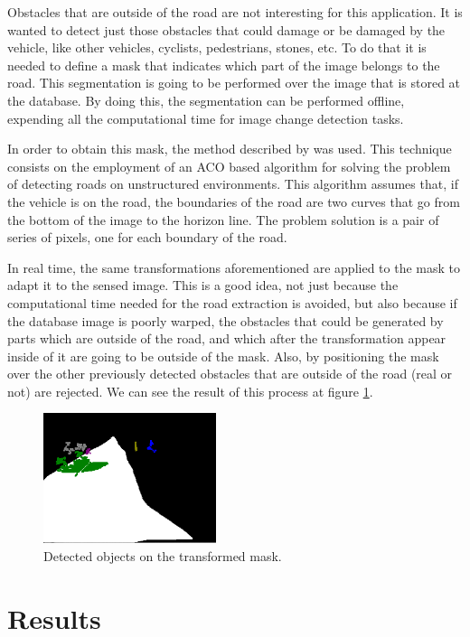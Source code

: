 Obstacles that are outside of the road are not interesting for this application. It is wanted to detect just those obstacles that could damage or be damaged by the vehicle, like other vehicles, cyclists, pedestrians, stones, etc. To do that it is needed to define a mask that indicates which part of the image belongs to the road. This segmentation is going to be performed over the image that is stored at the database. By doing this, the segmentation can be performed offline, expending all the computational time for image change detection tasks.

In order to obtain this mask, the method described by \cite{arnay2009applying} was used. This technique consists on the employment of an \ac{ACO} based algorithm for solving the problem of detecting roads on unstructured environments. This algorithm assumes that, if the vehicle is on the road, the boundaries of the road are two curves that go from the bottom of the image to the horizon line. The problem solution is a pair of series of pixels, one for each boundary of the road.

In real time, the same transformations aforementioned are applied to the mask to adapt it to the sensed image. This is a good idea, not just because the computational time needed for the road extraction is avoided, but also because if the database image is poorly warped, the obstacles that could be generated by parts which are outside of the road, and which after the transformation appear inside of it are going to be outside of the mask. Also, by positioning the mask over the other previously detected obstacles that are outside of the road (real or not) are rejected. We can see the result of this process at figure \ref{fig:cp02_mask_warped}.

\begin{figure}[h!]
\centering
\includegraphics[width=0.45\textwidth]{maskWarped}
\caption{Detected objects on the transformed mask.}\label{fig:cp02_mask_warped}
\end{figure}

\section{Results}\label{ch:chapter02_02}

